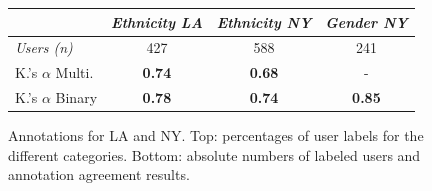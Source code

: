 \begin{figure}
{\begin{tabular}{| l | c | c | c |}
\hline
                          & {\textit{Ethnicity LA}} & {\textit{Ethnicity NY}} & {\textit{Gender NY}} \\ \hline
{\textit{Users (n)}}      & 427                     & 588                     & 241 \\ \hline
K.'s $\alpha$ Multi.      & \textbf{0.74}           & \textbf{0.68}           & -   \\ \hline
K.'s $\alpha$ Binary      & \textbf{0.78}           & \textbf{0.74}           & \textbf{0.85} \\ \hline
\end{tabular}
}
\vspace{0.7ex}
	\caption{Annotations for LA and NY. Top: percentages of user labels for the different categories. Bottom: absolute numbers of labeled users and annotation agreement results.}
	\label{fig:demographics}
\end{figure}


